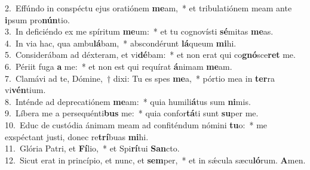 {2.~}Effúndo in conspéctu ejus oratiónem \textbf{me}am,~* et tribulatiónem meam ante \textbf{i}psum pro\textbf{nún}tio.\\
{3.~}In deficiéndo ex me spíritum \textbf{me}um:~* et tu cognovísti \textbf{sé}mitas \textbf{me}as.\\
{4.~}In via hac, qua ambu\textbf{lá}bam,~* abscondérunt \textbf{lá}queum \textbf{mi}hi.\\
{5.~}Considerábam ad déxteram, et vi\textbf{dé}bam:~* et non erat qui co\textbf{gnó}sce\textbf{ret} me.\\
{6.~}Périit fuga \textbf{a} me:~* et non est qui requírat \textbf{á}nimam \textbf{me}am.\\
{7.~}Clamávi ad te, Dómine,~† dixi: Tu es spes \textbf{me}a,~* pórtio mea in \textbf{ter}ra vi\textbf{vén}tium.\\
{8.~}Inténde ad deprecatiónem \textbf{me}am:~* quia humili\textbf{á}tus sum \textbf{ni}mis.\\
{9.~}Líbera me a persequénti\textbf{bus} me:~* quia confor\textbf{tá}ti sunt \textbf{su}per me.\\
{10.~}Educ de custódia ánimam meam ad confiténdum nómini \textbf{tu}o:~* me exspéctant justi, donec re\textbf{trí}buas \textbf{mi}hi.\\
{11.~}Glória Patri, et \textbf{Fí}lio,~* et Spi\textbf{rí}tui \textbf{San}cto.\\
{12.~}Sicut erat in princípio, et nunc, et \textbf{sem}per,~* et in sǽcula sæcu\textbf{ló}rum. \textbf{A}men.\\
